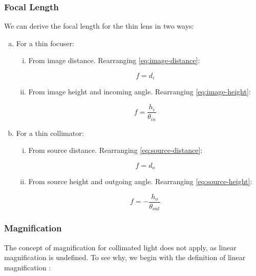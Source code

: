\subsubsection{Focal Length}
We can derive the focal length for the thin lens in two ways:

\begin{enumerate}[(a)]
    \item For a thin focuser:
    \begin{enumerate}[(i)]
        \item From image distance. Rearranging \eqref{eq:image-distance}:
    
        \begin{equation}
            \boxed{f = d_i}
        \end{equation}
        
        \item From image height and incoming angle. Rearranging \eqref{eq:image-height}:
    
        \begin{equation}
            \boxed{f = \frac{h_i}{\theta_{in}}}
        \end{equation}
    \end{enumerate}
    
    \item For a thin collimator:
    \begin{enumerate}[(i)]
        \item From source distance. Rearranging \eqref{eq:source-distance}:
        
        \begin{equation}
            \boxed{f = d_o}
        \end{equation}
        
        \item From source height and outgoing angle. Rearranging \eqref{eq:source-height}:
        
        \begin{equation}
            \boxed{f = -\frac{h_o}{\theta_{out}}}
        \end{equation}
    \end{enumerate}
\end{enumerate}


\subsubsection{Magnification} \label{sec:thin-magnification} 
The concept of magnification for collimated light does not apply, as linear magnification is undefined. To see why, we begin with the definition of linear magnification  \cite{Boundless_undated-to}:

